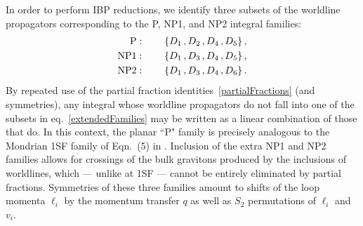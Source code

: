 \documentclass[twocolumn,superscriptaddress,amsmath, amssymb, amsfonts,preprintnumbers,aps,prd,longbibliography,nofootinbib]{revtex4-2}
\begin{document}
\begin{widetext}
In order to perform IBP reductions, we identify three subsets of the
worldline propagators corresponding to the {P, NP1, and NP2 integral families:
\begin{subequations}\label{extendedFamilies}
\begin{align}
  {\rm P}&: \qquad \{D_1\,,D_2\,,D_4\,,D_5\}\,, \\
  {\rm NP1}&: \qquad  \{D_1\,,D_3\,,D_4\,,D_5\}\,, \\
  {\rm NP2}&: \qquad  \{D_1\,,D_3\,,D_4\,,D_6\}\,.
\end{align}
\end{subequations}}
By repeated use of the partial fraction identities~\eqref{partialFractions} (and symmetries), any integral whose worldline propagators do not fall into one of the subsets in eq.~\eqref{extendedFamilies} may be written as a linear combination of those that do.
In this context, the planar ``P" family is precisely analogous to the Mondrian 1SF family
of Eqn.~(5) in \cite{Driesse:2024xad}.
Inclusion of the extra {NP1 and NP2} families allows for crossings of the bulk gravitons produced by the inclusions of worldlines, which --- unlike at 1SF --- cannot be entirely eliminated by partial fractions.
Symmetries of these three families amount to shifts of the loop momenta $\ell_{i}$ by the momentum transfer $q$ as well as $S_{2}$ permutations of $\ell_{i}$ and $v_{i}$.


\end{widetext}
\end{document}
